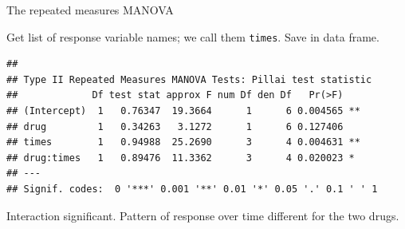 \begin{frame}[fragile]{The repeated measures MANOVA}

Get list of response variable names; we call them \texttt{times}. Save
in data frame.

{\footnotesize
 
\begin{knitrout}
\color{fgcolor}\begin{kframe}
\begin{alltt}
\hlkwb{=}
\hlkwb{=}
\hlkwb{=}\hlopt{::}
     \hlstd{=}\hlopt{~}
\end{alltt}
\begin{verbatim}
## 
## Type II Repeated Measures MANOVA Tests: Pillai test statistic
##             Df test stat approx F num Df den Df   Pr(>F)   
## (Intercept)  1   0.76347  19.3664      1      6 0.004565 **
## drug         1   0.34263   3.1272      1      6 0.127406   
## times        1   0.94988  25.2690      3      4 0.004631 **
## drug:times   1   0.89476  11.3362      3      4 0.020023 * 
## ---
## Signif. codes:  0 '***' 0.001 '**' 0.01 '*' 0.05 '.' 0.1 ' ' 1
\end{verbatim}
\end{kframe}
\end{knitrout}
}

Interaction significant. Pattern of response over time different
for the two drugs.
\end{frame}

